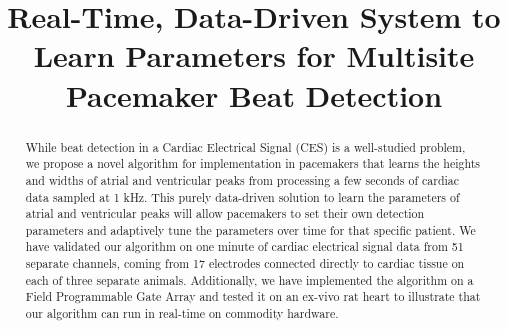 \documentclass[conference]{IEEEtran}
\begin{document}
%
\title{Real-Time, Data-Driven System to Learn
Parameters for Multisite Pacemaker Beat Detection}


\author{
}







\maketitle

\begin{abstract}
While beat detection in a Cardiac Electrical 
Signal (CES) is a well-studied problem, we propose a novel
algorithm for implementation in pacemakers that learns the
heights and widths of atrial and ventricular peaks from
processing a few seconds of cardiac data sampled at 1 kHz. 
This purely data-driven solution to learn the parameters of atrial
and ventricular peaks will allow pacemakers to set their own 
detection parameters and adaptively tune
the parameters over time for that specific patient.
We have validated our algorithm on one minute of cardiac electrical signal data from 51 separate channels,
coming from 17 electrodes connected directly to cardiac tissue on each of three separate animals.
Additionally, we have implemented the algorithm on a
Field Programmable Gate Array and tested it on an ex-vivo rat
heart to illustrate that our algorithm can run in real-time on commodity hardware.
\end{abstract}
\end{document}
